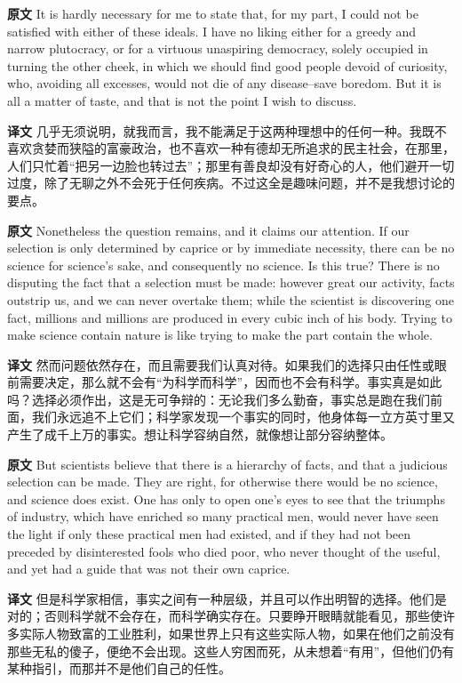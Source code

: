 \documentclass[UTF8]{ctexart}
\newenvironment{english}{\par\small\noindent\textbf{原文}\quad\ignorespaces}{\par}
\newenvironment{zhtranslation}{\par\noindent\textbf{译文}\quad\ignorespaces}{\par\vspace{0.35em}}
\begin{document}
\begin{english}
It is hardly necessary for me to state that, for my part, I could not be satisfied with either of these ideals. I have no liking either for a greedy and narrow plutocracy, or for a virtuous unaspiring democracy, solely occupied in turning the other cheek, in which we should find good people devoid of curiosity, who, avoiding all excesses, would not die of any disease--save boredom. But it is all a matter of taste, and that is not the point I wish to discuss.
\end{english}
\begin{zhtranslation}
几乎无须说明，就我而言，我不能满足于这两种理想中的任何一种。我既不喜欢贪婪而狭隘的富豪政治，也不喜欢一种有德却无所追求的民主社会，在那里，人们只忙着“把另一边脸也转过去”；那里有善良却没有好奇心的人，他们避开一切过度，除了无聊之外不会死于任何疾病。不过这全是趣味问题，并不是我想讨论的要点。\end{zhtranslation}

\begin{english}
Nonetheless the question remains, and it claims our attention. If our selection is only determined by caprice or by immediate necessity, there can be no science for science's sake, and consequently no science. Is this true? There is no disputing the fact that a selection must be made: however great our activity, facts outstrip us, and we can never overtake them; while the scientist is discovering one fact, millions and millions are produced in every cubic inch of his body. Trying to make science contain nature is like trying to make the part contain the whole.
\end{english}
\begin{zhtranslation}
然而问题依然存在，而且需要我们认真对待。如果我们的选择只由任性或眼前需要决定，那么就不会有“为科学而科学”，因而也不会有科学。事实真是如此吗？选择必须作出，这是无可争辩的：无论我们多么勤奋，事实总是跑在我们前面，我们永远追不上它们；科学家发现一个事实的同时，他身体每一立方英寸里又产生了成千上万的事实。想让科学容纳自然，就像想让部分容纳整体。\end{zhtranslation}

\begin{english}
But scientists believe that there is a hierarchy of facts, and that a judicious selection can be made. They are right, for otherwise there would be no science, and science does exist. One has only to open one's eyes to see that the triumphs of industry, which have enriched so many practical men, would never have seen the light if only these practical men had existed, and if they had not been preceded by disinterested fools who died poor, who never thought of the useful, and yet had a guide that was not their own caprice.
\end{english}
\begin{zhtranslation}
但是科学家相信，事实之间有一种层级，并且可以作出明智的选择。他们是对的；否则科学就不会存在，而科学确实存在。只要睁开眼睛就能看见，那些使许多实际人物致富的工业胜利，如果世界上只有这些实际人物，如果在他们之前没有那些无私的傻子，便绝不会出现。这些人穷困而死，从未想着“有用”，但他们仍有某种指引，而那并不是他们自己的任性。\end{zhtranslation}
\end{document}
